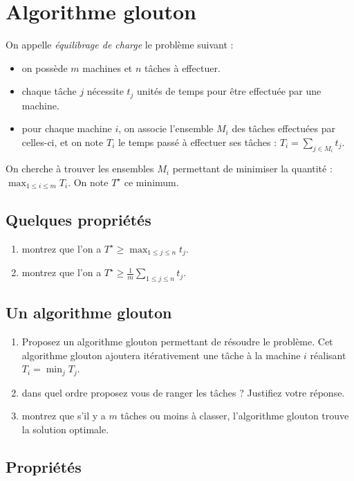 \documentclass
[12pt]
{article}
\begin{document}
\section{Algorithme glouton}

On appelle {\em équilibrage de charge} le problème suivant : 

\begin{itemize}
    \item on possède $m$ machines et $n$ tâches à effectuer.
    \item chaque tâche $j$ nécessite $t_j$ unités de temps pour être effectuée par une machine.
    \item pour chaque machine $i$, on associe l'ensemble $M_i$ des tâches effectuées par celles-ci, et on note $T_i$ le temps passé à effectuer ses tâches : $T_i = \sum_{j \in M_i} t_j$.
\end{itemize}

On cherche à trouver les ensembles $M_i$ permettant de minimiser la quantité : $\max_{1\leq i \leq m} T_i$. On note $T^\star$ ce minimum.

\subsection{Quelques propriétés}
\begin{enumerate}
    \item montrez que l'on a $T^\star \geq \max_{1 \leq j\leq n} t_j$.
    \item montrez que l'on a $T^\star \geq \frac{1}{m}\sum_{1 \leq j\leq n} t_j$.
\end{enumerate}

\subsection{Un algorithme glouton}

\begin{enumerate}
    \item Proposez un algorithme glouton permettant de résoudre le problème. Cet algorithme glouton ajoutera itérativement une tâche à la machine $i$ réalisant $T_i = \min_j T_j$.
    \item dans quel ordre proposez vous de ranger les tâches ? Justifiez votre réponse.
    \item montrez que s'il y a $m$ tâches ou moins à classer, l'algorithme glouton trouve la solution optimale.
\end{enumerate}

\subsection{Propriétés}
\end{document}
